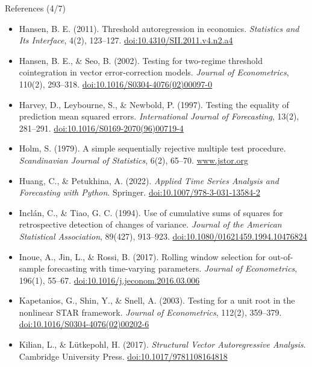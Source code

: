 \begin{frame}{References (4/7)}
\itemsize{\tiny}
\begin{itemize}
    \item Hansen, B. E. (2011). Threshold autoregression in economics. \textit{Statistics and Its Interface}, 4(2), 123--127. \href{https://doi.org/10.4310/SII.2011.v4.n2.a4}{doi:10.4310/SII.2011.v4.n2.a4}
    \item Hansen, B. E., \& Seo, B. (2002). Testing for two-regime threshold cointegration in vector error-correction models. \textit{Journal of Econometrics}, 110(2), 293--318. \href{https://doi.org/10.1016/S0304-4076(02)00097-0}{doi:10.1016/S0304-4076(02)00097-0}
    \item Harvey, D., Leybourne, S., \& Newbold, P. (1997). Testing the equality of prediction mean squared errors. \textit{International Journal of Forecasting}, 13(2), 281--291. \href{https://doi.org/10.1016/S0169-2070(96)00719-4}{doi:10.1016/S0169-2070(96)00719-4}
    \item Holm, S. (1979). A simple sequentially rejective multiple test procedure. \textit{Scandinavian Journal of Statistics}, 6(2), 65--70. \href{https://www.jstor.org/stable/4615733}{www.jstor.org}
    \item Huang, C., \& Petukhina, A. (2022). \textit{Applied Time Series Analysis and Forecasting with Python}. Springer. \href{https://doi.org/10.1007/978-3-031-13584-2}{doi:10.1007/978-3-031-13584-2}
    \item Inclán, C., \& Tiao, G. C. (1994). Use of cumulative sums of squares for retrospective detection of changes of variance. \textit{Journal of the American Statistical Association}, 89(427), 913--923. \href{https://doi.org/10.1080/01621459.1994.10476824}{doi:10.1080/01621459.1994.10476824}
    \item Inoue, A., Jin, L., \& Rossi, B. (2017). Rolling window selection for out-of-sample forecasting with time-varying parameters. \textit{Journal of Econometrics}, 196(1), 55--67. \href{https://doi.org/10.1016/j.jeconom.2016.03.006}{doi:10.1016/j.jeconom.2016.03.006}
    \item Kapetanios, G., Shin, Y., \& Snell, A. (2003). Testing for a unit root in the nonlinear STAR framework. \textit{Journal of Econometrics}, 112(2), 359--379. \href{https://doi.org/10.1016/S0304-4076(02)00202-6}{doi:10.1016/S0304-4076(02)00202-6}
    \item Kilian, L., \& Lütkepohl, H. (2017). \textit{Structural Vector Autoregressive Analysis}. Cambridge University Press. \href{https://doi.org/10.1017/9781108164818}{doi:10.1017/9781108164818}

\end{itemize}
\end{frame}
